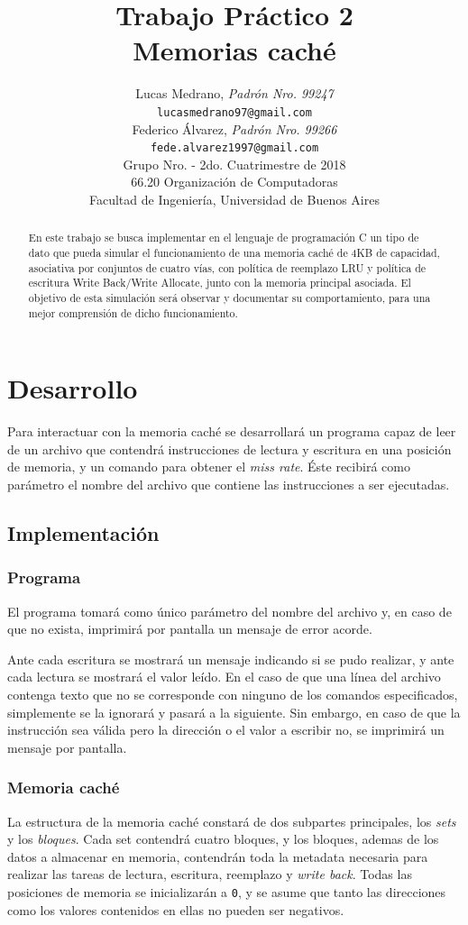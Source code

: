 \documentclass[a4paper, 12pt]{article}
\title{		\textbf{Trabajo Práctico 2}\\
			\textbf{Memorias caché}
			}
\author{	Lucas Medrano, \textit{Padrón Nro. 99247}                     	\\
            \texttt{ lucasmedrano97@gmail.com }                           		\\
            Federico Álvarez, \textit{Padrón Nro. 99266}                 	\\
            \texttt{ fede.alvarez1997@gmail.com }                                 	\\[2.5ex]
            \normalsize{Grupo Nro. \quad - 2do. Cuatrimestre de 2018}      	\\
            \normalsize{66.20 Organización de Computadoras}               	\\
            \normalsize{Facultad de Ingeniería, Universidad de Buenos Aires}\\
       }
\date{}
\begin{document}
	\lstset{inputencoding=utf8/latin1} %
	\maketitle
	\thispagestyle{empty}
	\begin{abstract}
		En este trabajo se busca implementar en el lenguaje de programación C un tipo de dato que pueda simular el funcionamiento de una memoria caché de 4KB de capacidad, asociativa por conjuntos de cuatro vías, con política de reemplazo LRU y política de escritura Write Back/Write Allocate, junto con la memoria principal asociada. El objetivo de esta simulación será observar y documentar su comportamiento, para una mejor comprensión de dicho funcionamiento.
	\end{abstract}
	
	\pagebreak
	\thispagestyle{empty}
	\tableofcontents
	\newpage
	
	\setcounter{page}{1}
	
	\section{Desarrollo}
	Para interactuar con la memoria caché se desarrollará un programa capaz de leer de un archivo que contendrá instrucciones de lectura y escritura en una posición de memoria, y un comando para obtener el \textit{miss rate}. Éste recibirá como parámetro el nombre del archivo que contiene las instrucciones a ser ejecutadas.
	\subsection{Implementación}
	\subsubsection{Programa}
	El programa tomará como único parámetro del nombre del archivo y, en caso de que no exista, imprimirá por pantalla un mensaje de error acorde.
	
	Ante cada escritura se mostrará un mensaje indicando si se pudo realizar, y ante cada lectura se mostrará el valor leído.
	En el caso de que una línea del archivo contenga texto que no se corresponde con ninguno de los comandos especificados, simplemente se la ignorará y pasará a la siguiente. Sin embargo, en caso de que la instrucción sea válida pero la dirección o el valor a escribir no, se imprimirá un mensaje por pantalla.
	
	\subsubsection{Memoria caché}
	La estructura de la memoria caché constará de dos subpartes principales, los \textit{sets} y los \textit{bloques}. Cada set contendrá cuatro bloques, y los bloques, ademas de los datos a almacenar en memoria, contendrán toda la metadata necesaria para realizar las tareas de lectura, escritura, reemplazo y \textit{write back}. Todas las posiciones de memoria se inicializarán a \texttt{0}, y se asume que tanto las direcciones como los valores contenidos en ellas no pueden ser negativos.
	
\end{document}
